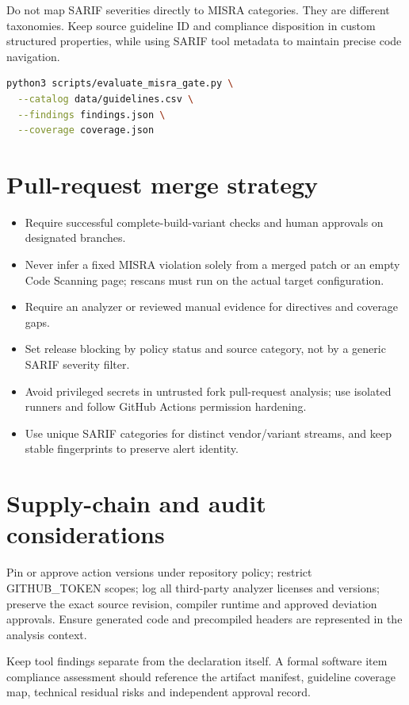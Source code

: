\documentclass[10pt,letterpaper]{article}
\begin{document}
Do not map SARIF severities directly to MISRA categories. They are different taxonomies. Keep source guideline ID and compliance disposition in custom structured properties, while using SARIF tool metadata to maintain precise code navigation.

\begin{lstlisting}[language=bash,caption={Gate invocation after vendor analysis}]
python3 scripts/evaluate_misra_gate.py \
  --catalog data/guidelines.csv \
  --findings findings.json \
  --coverage coverage.json
\end{lstlisting}

\section{Pull-request merge strategy}
\begin{itemize}
\item Require successful complete-build-variant checks and human approvals on designated branches.
\item Never infer a fixed MISRA violation solely from a merged patch or an empty Code Scanning page; rescans must run on the actual target configuration.
\item Require an analyzer or reviewed manual evidence for directives and coverage gaps.
\item Set release blocking by policy status and source category, not by a generic SARIF severity filter.
\item Avoid privileged secrets in untrusted fork pull-request analysis; use isolated runners and follow GitHub Actions permission hardening.
\item Use unique SARIF categories for distinct vendor/variant streams, and keep stable fingerprints to preserve alert identity.
\end{itemize}

\section{Supply-chain and audit considerations}
Pin or approve action versions under repository policy; restrict GITHUB\_TOKEN scopes; log all third-party analyzer licenses and versions; preserve the exact source revision, compiler runtime and approved deviation approvals. Ensure generated code and precompiled headers are represented in the analysis context.

Keep tool findings separate from the declaration itself. A formal software item compliance assessment should reference the artifact manifest, guideline coverage map, technical residual risks and independent approval record.
\end{document}
